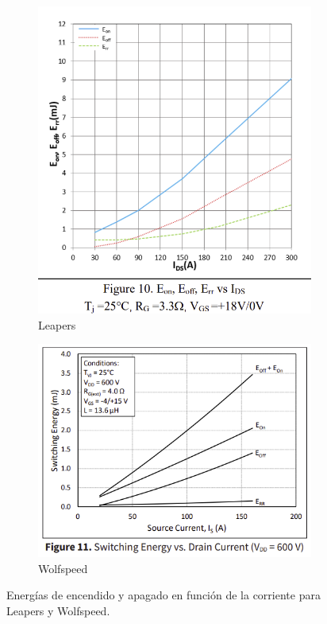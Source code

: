 \begin{figure}[H]
	\centering
	\begin{subfigure}[b]{0.4\linewidth}
		\centering
		\includegraphics[width=\linewidth]{fig/eoneoffleapers}
		\caption{Leapers}
	\end{subfigure}
	\hfill
	\begin{subfigure}[b]{0.55\linewidth}
		\centering
		\includegraphics[width=\linewidth]{fig/eoneoffwolfspeed}
		\caption{Wolfspeed}
	\end{subfigure}
	\caption{Energías de encendido y apagado en función de la corriente para Leapers y Wolfspeed.}
\end{figure}

